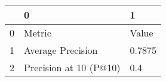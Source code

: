 \begin{tabular}{lll}
\toprule
{} &                       0 &       1 \\
\midrule
0 &                  Metric &   Value \\
1 &       Average Precision &  0.7875 \\
2 &  Precision at 10 (P@10) &     0.4 \\
\bottomrule
\end{tabular}
